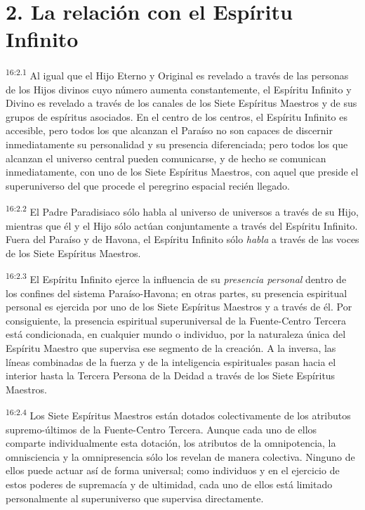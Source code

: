 \section*{2. La relación con el Espíritu Infinito}
\par
\textsuperscript{16:2.1} Al igual que el Hijo Eterno y Original es revelado a través de las personas de los Hijos divinos cuyo número aumenta constantemente, el Espíritu Infinito y Divino es revelado a través de los canales de los Siete Espíritus Maestros y de sus grupos de espíritus asociados. En el centro de los centros, el Espíritu Infinito es accesible, pero todos los que alcanzan el Paraíso no son capaces de discernir inmediatamente su personalidad y su presencia diferenciada; pero todos los que alcanzan el universo central pueden comunicarse, y de hecho se comunican inmediatamente, con uno de los Siete Espíritus Maestros, con aquel que preside el superuniverso del que procede el peregrino espacial recién llegado.

\par
\textsuperscript{16:2.2} El Padre Paradisiaco sólo habla al universo de universos a través de su Hijo, mientras que él y el Hijo sólo actúan conjuntamente a través del Espíritu Infinito. Fuera del Paraíso y de Havona, el Espíritu Infinito sólo \textit{habla} a través de las voces de los Siete Espíritus Maestros.

\par
\textsuperscript{16:2.3} El Espíritu Infinito ejerce la influencia de su \textit{presencia personal} dentro de los confines del sistema Paraíso-Havona; en otras partes, su presencia espiritual personal es ejercida por uno de los Siete Espíritus Maestros y a través de él. Por consiguiente, la presencia espiritual superuniversal de la Fuente-Centro Tercera está condicionada, en cualquier mundo o individuo, por la naturaleza única del Espíritu Maestro que supervisa ese segmento de la creación. A la inversa, las líneas combinadas de la fuerza y de la inteligencia espirituales pasan hacia el interior hasta la Tercera Persona de la Deidad a través de los Siete Espíritus Maestros.

\par
\textsuperscript{16:2.4} Los Siete Espíritus Maestros están dotados colectivamente de los atributos supremo-últimos de la Fuente-Centro Tercera. Aunque cada uno de ellos comparte individualmente esta dotación, los atributos de la omnipotencia, la omnisciencia y la omnipresencia sólo los revelan de manera colectiva. Ninguno de ellos puede actuar así de forma universal; como individuos y en el ejercicio de estos poderes de supremacía y de ultimidad, cada uno de ellos está limitado personalmente al superuniverso que supervisa directamente.

